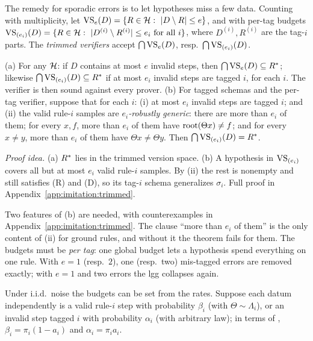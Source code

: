 The remedy for sporadic errors is to let hypotheses miss a few data. Counting with multiplicity, let $\mathrm{VS}_e(D)=\{R\in\mathcal{H}:\ |D\setminus R|\le e\}$, and with per-tag budgets $\mathrm{VS}_{(e_i)}(D)=\{R\in\mathcal{H}:\ |D^{(i)}\setminus R^{(i)}|\le e_i\ \text{for all }i\}$, where $D^{(i)},R^{(i)}$ are the tag-$i$ parts. The \emph{trimmed verifiers} accept $\bigcap\mathrm{VS}_e(D)$, resp.\ $\bigcap\mathrm{VS}_{(e_i)}(D)$.

\begin{theorem}\label{thm:imitation:trimmed}
\textup{(a)} For any $\mathcal{H}$: if $D$ contains at most $e$ invalid steps, then $\bigcap\mathrm{VS}_e(D)\subseteq R^{*}$; likewise $\bigcap\mathrm{VS}_{(e_i)}(D)\subseteq R^{*}$ if at most $e_i$ invalid steps are tagged $i$, for each $i$. The verifier is then sound against every prover.
\textup{(b)} For tagged schemas and the per-tag verifier, suppose that for each $i$: \textup{(i)} at most $e_i$ invalid steps are tagged $i$; and \textup{(ii)} the valid rule-$i$ samples are \emph{$e_i$-robustly generic}: there are more than $e_i$ of them; for every $x,f$, more than $e_i$ of them have $\mathrm{root}(\Theta x)\neq f$; and for every $x\neq y$, more than $e_i$ of them have $\Theta x\neq\Theta y$. Then $\bigcap\mathrm{VS}_{(e_i)}(D)=R^{*}$.
\end{theorem}

\noindent\emph{Proof idea.} (a) $R^{*}$ lies in the trimmed version space. (b) A hypothesis in $\mathrm{VS}_{(e_i)}$ covers all but at most $e_i$ valid rule-$i$ samples. By (ii) the rest is nonempty and still satisfies (R) and (D), so its tag-$i$ schema generalizes $\sigma_i$. Full proof in Appendix~\ref{app:imitation:trimmed}.

Two features of (b) are needed, with counterexamples in Appendix~\ref{app:imitation:trimmed}. The clause ``more than $e_i$ of them'' is the only content of (ii) for ground rules, and without it the theorem fails for them. The budgets must be \emph{per tag}: one global budget lets a hypothesis spend everything on one rule.  With $e=1$ (resp.\ $2$), one (resp.\ two) mis-tagged errors are removed exactly; with $e=1$ and two errors the lgg collapses again.

Under i.i.d.\ noise the budgets can be set from the rates. Suppose each datum independently is a valid rule-$i$ step with probability $\beta_i$ (with $\Theta\sim\Lambda_i$), or an invalid step tagged $i$ with probability $\alpha_i$ (with arbitrary law); in terms of , $\beta_i=\pi_i(1-a_i)$ and $\alpha_i=\pi_ia_i$.

